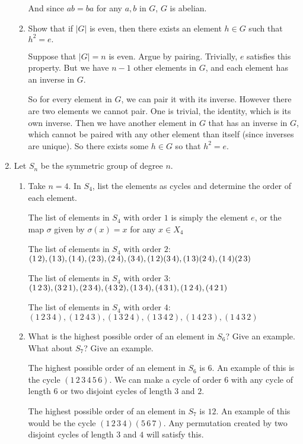 \documentclass{article}
\begin{document}
\begin{enumerate}
\begin{enumerate}[label= (\alph*)]
            And since $ab=ba$ for any $a,b$ in $G$, $G$ is abelian.

        \item  Show that if $|G|$ is even, then there exists an element $h \in G$ such that $h^2=e.$

            Suppose that $|G|=n$ is even.
            Argue by pairing. Trivially, $e$ satisfies this property. But we have $n-1$ other elements 
            in $G$, and each element has an inverse in $G$.

            So for every element in $G$, we can pair it with its inverse. However there are two elements we cannot pair. One is trivial, the identity, which is its own inverse. Then we have another element in $G$ that has an inverse in $G$, which cannot be paired with any other element than itself (since inverses are unique). So there exists some $h\in  G$ so that $h^2=e$.
    \end{enumerate}
\item Let $S_n$ be the symmetric group of degree $n$.
\begin{enumerate}[label= (\alph*)] 
    \item Take $n = 4$. In $S_4$, list the elements as cycles and determine the order of each element.

        The list of elements in $S_4$ with order $1$ is simply the element $e$, or the map $\sigma$
        given by $\sigma(x)=x$ for any $x \in X_4$

        The list of elements in $S_4$ with order $2$: $(1\,2),(1\,3),(1\,4),(2\,3),(2\,4),(3\,4),(1\,2)\\(3\,4),(1\,3)(2\,4),(1\,4)(2\,3)$

        The list of elements in $S_4$ with order $3$: $(1\,2\,3),(3\,2\,1),(2\,3\,4),(4\,3\,2),(1\,3\,4),\\(4\,3\,1),(1\,2\,4),(4\,2\,1)$

        The list of elements in $S_4$ with order $4$: $(1\,2\,3\,4),(1\,2\,4\,3),(1\,3\,2\,4),(1\,3\,4\,2),(1\,4\,2\,3),(1\,4\,3\,2)$

    \item What is the highest possible order of an element in $S_6$? Give an example. 
        What about $S_7$? Give an example.

        The highest possible order of an element in $S_6$ is $6$. An example of this is the cycle $(1\,2\,3\,4\,5\,6)$. We can make a cycle of order $6$ with any cycle of length $6$ or two disjoint cycles of length $3$ and $2$.

        The highest possible order of an element in $S_7$ is $12$. An example of this would be the cycle $(1\,2\,3\,4)(5\,6\,7)$. Any permutation created by two disjoint cycles of length $3$ and $4$ will satisfy this.
\end{enumerate}
\end{enumerate}
\end{document}
